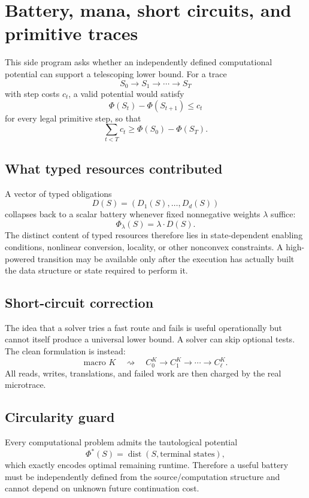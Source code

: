 \documentclass[11pt]{article}
\begin{document}
\section{Battery, mana, short circuits, and primitive traces}

This side program asks whether an independently defined computational potential can support a
telescoping lower bound. For a trace
\[
S_0\to S_1\to\cdots\to S_T
\]
with step costs \(c_t\), a valid potential would satisfy
\[
\Phi(S_t)-\Phi(S_{t+1})\le c_t
\]
for every legal primitive step, so that
\[
\sum_{t<T} c_t
\ge
\Phi(S_0)-\Phi(S_T).
\]

\subsection{What typed resources contributed}

A vector of typed obligations
\[
D(S)=(D_1(S),\ldots,D_d(S))
\]
collapses back to a scalar battery whenever fixed nonnegative weights
\(\lambda\) suffice:
\[
\Phi_\lambda(S)=\lambda\cdot D(S).
\]
The distinct content of typed resources therefore lies in state-dependent enabling conditions,
nonlinear conversion, locality, or other nonconvex constraints. A high-powered transition may be
available only after the execution has actually built the data structure or state required to perform
it.

\subsection{Short-circuit correction}

The idea that a solver tries a fast route and fails is useful operationally but cannot itself produce
a universal lower bound. A solver can skip optional tests. The clean formulation is instead:
\[
\text{macro }K
\quad\rightsquigarrow\quad
C_0^K\to C_1^K\to\cdots\to C_\ell^K.
\]
All reads, writes, translations, and failed work are then charged by the real microtrace.

\subsection{Circularity guard}

Every computational problem admits the tautological potential
\[
\Phi^*(S)=\operatorname{dist}(S,\text{terminal states}),
\]
which exactly encodes optimal remaining runtime. Therefore a useful battery must be independently
defined from the source/computation structure and cannot depend on unknown future continuation cost.
\end{document}
